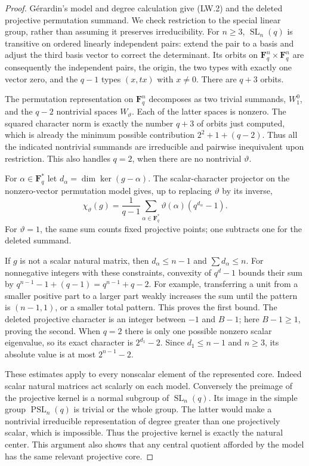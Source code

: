 \begin{proof}
G\'erardin's model and degree calculation give (LW.2) and the deleted
projective permutation summand. We check restriction to the special
linear group, rather than assuming it preserves irreducibility.
For $n\ge3$, $\operatorname{SL}_n(q)$ is transitive on ordered
linearly independent pairs: extend the pair to a basis and adjust
the third basis vector to correct the determinant. Its orbits on
$\mathbf F_q^n\times\mathbf F_q^n$ are consequently the independent
pairs, the origin, the two types with exactly one vector zero, and
the $q-1$ types $(x,tx)$ with $x\ne0$. There are $q+3$ orbits.

The permutation representation on $\mathbf F_q^n$ decomposes as
two trivial summands, $W_1^0$, and the $q-2$ nontrivial spaces
$W_\vartheta$. Each of the latter spaces is nonzero. The squared
character norm is exactly the number $q+3$ of orbits just computed,
which is already the minimum possible contribution
$2^2+1+(q-2)$. Thus all the indicated nontrivial summands are
irreducible and pairwise inequivalent upon restriction. This also
handles $q=2$, when there are no nontrivial $\vartheta$.

For $\alpha\in\mathbf F_q^*$ let
$d_\alpha=\dim\ker(g-\alpha)$. The scalar-character projector on
the nonzero-vector permutation model gives, up to replacing
$\vartheta$ by its inverse,
\[
 \chi_\vartheta(g)=\frac1{q-1}
        \sum_{\alpha\in\mathbf F_q^*}
                  \vartheta(\alpha)(q^{d_\alpha}-1).
                                                               \tag{LW.4}
\]
For $\vartheta=1$, the same sum counts fixed projective points;
one subtracts one for the deleted summand.

If $g$ is not a scalar natural matrix, then
$d_\alpha\le n-1$ and $\sum d_\alpha\le n$.
For nonnegative integers with these constraints, convexity of
$q^d-1$ bounds their sum by
$q^{n-1}-1+(q-1)=q^{n-1}+q-2$.
For example, transferring a unit from a smaller positive part to
a larger part weakly increases the sum until the pattern is
$(n-1,1)$, or a smaller total pattern. This proves the first
bound. The deleted projective character is an integer between
$-1$ and $B-1$; here $B-1\ge1$, proving the second.
When $q=2$ there is only one possible nonzero scalar eigenvalue,
so its exact character is $2^{d_1}-2$. Since $d_1\le n-1$ and
$n\ge3$, its absolute value is at most $2^{n-1}-2$.

These estimates apply to every nonscalar element of the represented
core. Indeed scalar natural matrices act scalarly on each model.
Conversely the preimage of the projective kernel is a normal
subgroup of $\operatorname{SL}_n(q)$. Its image in the simple group
$\operatorname{PSL}_n(q)$ is trivial or the whole group. The latter
would make a nontrivial irreducible representation of degree
greater than one projectively scalar, which is impossible.
Thus the projective kernel is exactly the natural center. This
argument also shows that any central quotient afforded by the
model has the same relevant projective core.


\end{proof}
